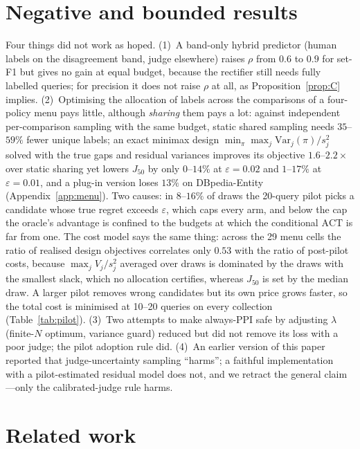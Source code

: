 \documentclass{article}
\newcommand{\eps}{\varepsilon}
\newcommand{\ACT}{\mathrm{ACT}}
\newcommand{\Jfifty}{J_{50}}
\begin{document}
\section{Negative and bounded results}\label{sec:negative}
Four things did not work as hoped. (1)~A band-only hybrid predictor (human labels on the disagreement band, judge elsewhere) raises $\rho$ from $0.6$ to $0.9$ for set-F1 but gives no gain at equal budget, because the rectifier still needs fully labelled queries; for precision it does not raise $\rho$ at all, as Proposition~\ref{prop:C} implies. (2)~Optimising the allocation of labels across the comparisons of a four-policy menu pays little, although \emph{sharing} them pays a lot: against independent per-comparison sampling with the same budget, static shared sampling needs $35$--$59\%$ fewer unique labels; an exact minimax design $\min_\pi\max_j \mathrm{Var}_j(\pi)/s_j^2$ solved with the true gaps and residual variances improves its objective $1.6$--$2.2\times$ over static sharing yet lowers $\Jfifty$ by only $0$--$14\%$ at $\eps=0.02$ and $1$--$17\%$ at $\eps=0.01$, and a plug-in version loses $13\%$ on DBpedia-Entity (Appendix~\ref{app:menu}). Two causes: in $8$--$16\%$ of draws the 20-query pilot picks a candidate whose true regret exceeds $\eps$, which caps every arm, and below the cap the oracle's advantage is confined to the budgets at which the conditional $\ACT$ is far from one. The cost model says the same thing: across the 29 menu cells the ratio of realised design objectives correlates only $0.53$ with the ratio of post-pilot costs, because $\max_j V_j/s_j^2$ averaged over draws is dominated by the draws with the smallest slack, which no allocation certifies, whereas $\Jfifty$ is set by the median draw. A larger pilot removes wrong candidates but its own price grows faster, so the total cost is minimised at 10--20 queries on every collection (Table~\ref{tab:pilot}). (3)~Two attempts to make always-PPI safe by adjusting $\lambda$ (finite-$N$ optimum, variance guard) reduced but did not remove its loss with a poor judge; the pilot adoption rule did. (4)~An earlier version of this paper reported that judge-uncertainty sampling ``harms''; a faithful implementation with a pilot-estimated residual model does not, and we retract the general claim---only the calibrated-judge rule harms.

\section{Related work}\label{sec:related}
\end{document}
